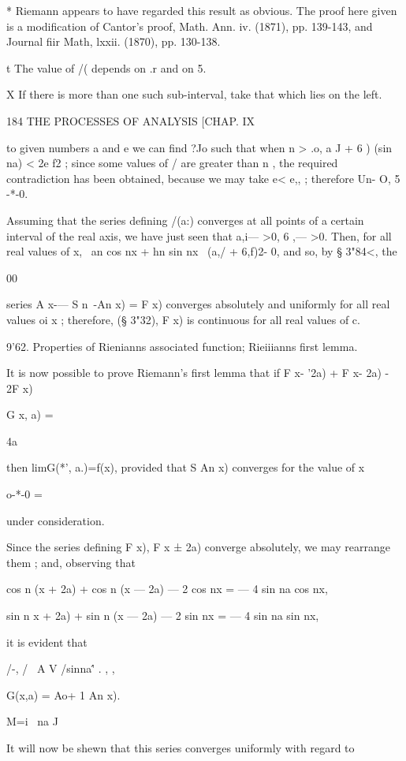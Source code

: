 * Riemann appears to have regarded this result as obvious. The proof
here given is a modification of Cantor's proof, Math. Ann. iv. (1871),
pp. 139-143, and Journal fiir Math, lxxii. (1870), pp. 130-138.

t The value of /( depends on .r and on 5.

X If there is more than one such sub-interval, take that which lies on
the left.

184 THE PROCESSES OF ANALYSIS [CHAP. IX

to given numbers a and e we can find ?Jo such that when n > .o, a J +
6 ) (sin na) < 2e f2 ; since some values of / are greater than n , the
required contradiction has been obtained, because we may take e< e,, ;
therefore Un- O, 5 -*-0.

Assuming that the series defining /(a:) converges at all points of a
certain interval of the real axis, we have just seen that a,i— >0, 6
,— >0. Then, for all real values of x, \ an cos nx + hn sin nx \ (a,/
+ 6,f)2- 0, and so, by § 3"84<, the

00

series A x-— S n~-An x) = F x) converges absolutely and uniformly for
all real values oi x ; therefore, (§ 3"32), F x) is continuous for all
real values of c.

9'62. Properties of Rienianns associated function; Rieiiianns first
lemma.

It is now possible to prove Riemann's first lemma that if F x- '2a) +
F x- 2a) - 2F x)

G x, a) =

4a

then limG(*', a.)=f(x), provided that S An x) converges for the value
of x

o-*-0 =

under consideration.

Since the series defining F x), F x ± 2a) converge absolutely, we may
rearrange them ; and, observing that

cos n (x + 2a) + cos n (x — 2a) — 2 cos nx = — 4 sin na cos nx,

sin n x + 2a) + sin n (x — 2a) — 2 sin nx = — 4 sin na sin nx,

it is evident that

/-, / \ A V /sinna\'' . , ,

G(x,a) = Ao+ 1 An x).

M=i \ na J

It will now be shewn that this series converges uniformly with regard
to

